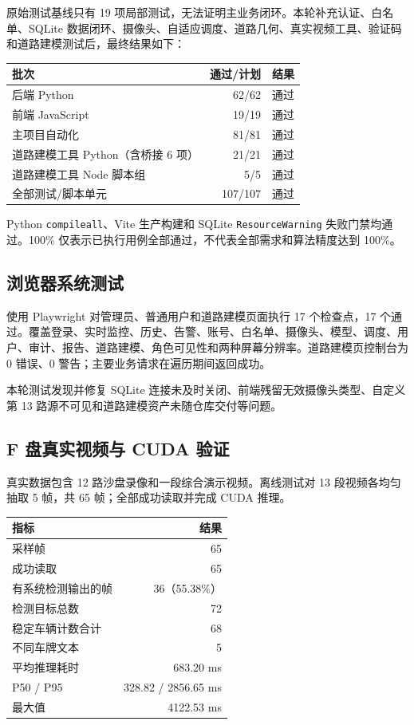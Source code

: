 原始测试基线只有 19 项局部测试，无法证明主业务闭环。本轮补充认证、白名单、SQLite 数据闭环、摄像头、自适应调度、道路几何、真实视频工具、验证码和道路建模测试后，最终结果如下：

\begin{longtable}[]{@{}lrl@{}}
\toprule\noalign{}
批次 & 通过/计划 & 结果 \\
\midrule\noalign{}
\endhead
\bottomrule\noalign{}
\endlastfoot
后端 Python & 62/62 & 通过 \\
前端 JavaScript & 19/19 & 通过 \\
主项目自动化 & 81/81 & 通过 \\
道路建模工具 Python（含桥接 6 项） & 21/21 & 通过 \\
道路建模工具 Node 脚本组 & 5/5 & 通过 \\
全部测试/脚本单元 & 107/107 & 通过 \\
\end{longtable}

Python \texttt{compileall}、Vite 生产构建和 SQLite \texttt{Resource\allowbreak{}Warning} 失败门禁均通过。100\% 仅表示已执行用例全部通过，不代表全部需求和算法精度达到 100\%。

\subsection{浏览器系统测试}\label{summary-ux6d4fux89c8ux5668ux7cfbux7edfux6d4bux8bd5}

使用 Playwright 对管理员、普通用户和道路建模页面执行 17 个检查点，17 个通过。覆盖登录、实时监控、历史、告警、账号、白名单、摄像头、模型、调度、用户、审计、报告、道路建模、角色可见性和两种屏幕分辨率。道路建模页控制台为 0 错误、0 警告；主要业务请求在遍历期间返回成功。

本轮测试发现并修复 SQLite 连接未及时关闭、前端残留无效摄像头类型、自定义第 13 路源不可见和道路建模资产未随仓库交付等问题。

\subsection{F 盘真实视频与 CUDA 验证}\label{summary-f-ux76d8ux771fux5b9eux89c6ux9891ux4e0e-cuda-ux9a8cux8bc1}

真实数据包含 12 路沙盘录像和一段综合演示视频。离线测试对 13 段视频各均匀抽取 5 帧，共 65 帧；全部成功读取并完成 CUDA 推理。

\begin{longtable}[]{@{}lr@{}}
\toprule\noalign{}
指标 & 结果 \\
\midrule\noalign{}
\endhead
\bottomrule\noalign{}
\endlastfoot
采样帧 & 65 \\
成功读取 & 65 \\
有系统检测输出的帧 & 36（55.38\%） \\
检测目标总数 & 72 \\
稳定车辆计数合计 & 68 \\
不同车牌文本 & 5 \\
平均推理耗时 & 683.20 ms \\
P50 / P95 & 328.82 / 2856.65 ms \\
最大值 & 4122.53 ms \\
\end{longtable}

